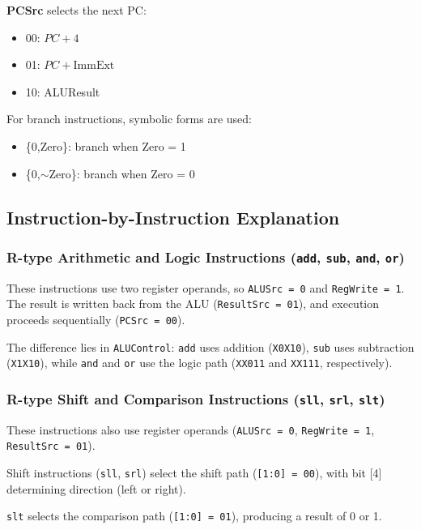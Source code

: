 \documentclass[acmsmall]{acmart}
\begin{document}
\textbf{PCSrc} selects the next PC:
\begin{itemize}
    \item 00: $PC + 4$
    \item 01: $PC + \text{ImmExt}$
    \item 10: ALUResult
\end{itemize}

For branch instructions, symbolic forms are used:
\begin{itemize}
    \item \{0,Zero\}: branch when Zero = 1
    \item \{0,$\sim$Zero\}: branch when Zero = 0
\end{itemize}

\subsection {Instruction-by-Instruction Explanation}
\subsubsection{R-type Arithmetic and Logic Instructions (\texttt{add}, \texttt{sub}, \texttt{and}, \texttt{or})}

These instructions use two register operands, so \texttt{ALUSrc = 0} and \texttt{RegWrite = 1}. The result is written back from the ALU (\texttt{ResultSrc = 01}), and execution proceeds sequentially (\texttt{PCSrc = 00}).

The difference lies in \texttt{ALUControl}:  
\texttt{add} uses addition (\texttt{X0X10}), \texttt{sub} uses subtraction (\texttt{X1X10}), while \texttt{and} and \texttt{or} use the logic path (\texttt{XX011} and \texttt{XX111}, respectively).

\subsubsection{R-type Shift and Comparison Instructions (\texttt{sll}, \texttt{srl}, \texttt{slt})}

These instructions also use register operands (\texttt{ALUSrc = 0}, \texttt{RegWrite = 1}, \texttt{ResultSrc = 01}).

Shift instructions (\texttt{sll}, \texttt{srl}) select the shift path (\texttt{[1:0] = 00}), with bit [4] determining direction (left or right).  

\texttt{slt} selects the comparison path (\texttt{[1:0] = 01}), producing a result of 0 or 1.
\end{document}
